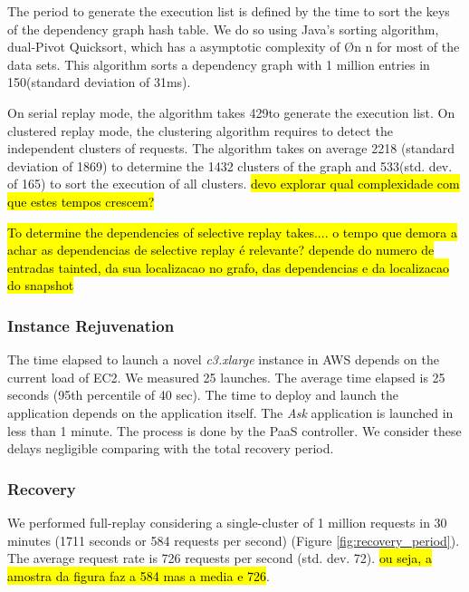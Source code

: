 The period to generate the execution list is defined by the time to sort the keys of the dependency graph hash table. We do so using Java's sorting algorithm, dual-Pivot Quicksort, which has a asymptotic complexity of \O{n \log{} n} for most of the data sets. This algorithm sorts a dependency graph with 1 million entries in 150\ms (standard deviation of 31ms). 

On serial replay mode, the algorithm takes 429\ms to generate the execution list. On clustered replay mode, the clustering algorithm requires to detect the independent clusters of requests. The algorithm takes on average 2218 \ms (standard deviation of 1869\ms) to determine the 1432 clusters of the graph and 533\ms (std. dev. of 165\ms) to sort the execution of all clusters. \hl{devo explorar qual complexidade com que estes tempos crescem?}

\hl{To determine the dependencies of selective replay takes....  o tempo que demora a achar as dependencias de selective replay é relevante? depende do numero de entradas tainted, da sua localizacao no grafo, das dependencias e da localizacao do snapshot}\\



\subsubsection{Instance Rejuvenation}\label{sec:eval:recovery:rejunation}
The time elapsed to launch a novel \emph{c3.xlarge} instance in \ac{AWS} depends on the current load of EC2. We measured 25 launches. The average time elapsed is 25 seconds (95th percentile of 40 sec). The time to deploy and launch the application depends on the application itself. The \emph{Ask} application is launched in less than 1 minute. The process is done by the \ac{PaaS} controller. We consider these delays negligible comparing with the total recovery period.\\

  
\subsubsection{Recovery}\label{sec:eval:recovery:recovery}
We performed full-replay considering a single-cluster of 1 million requests in 30 minutes (1711 seconds or 584 requests per second) (Figure \ref{fig:recovery_period}). The average request rate is 726 requests per second (std. dev. 72). \hl{ou seja, a amostra da figura faz a 584 mas a media e 726}. 

